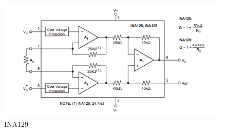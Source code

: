 \begin{figure}[H]
\begin{center}
\includegraphics[width=12cm]{implementation/figures/INA129}
\end{center}
\caption{INA129\cite{ina}}
\label{fig:INA129}
\end{figure}
